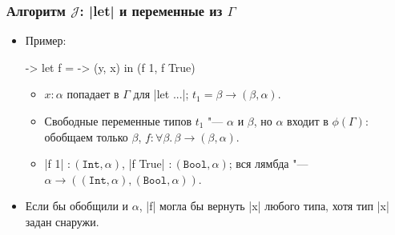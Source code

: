 \documentclass[11pt]{beamer}
\newcommand{\tInt}{\mathtt{Int}}
\newcommand{\tBool}{\mathtt{Bool}}
\newcommand{\J}{\mathcal{J}}
\begin{document}
\begin{frame}[fragile]
  \frametitle{Алгоритм $\J$: \haskinline|let| и переменные из $\Gamma$}
  \begin{itemize}
    \item Пример:
          \begin{haskell}
            \x -> let f = \y -> (y, x)
                  in (f 1, f True)
          \end{haskell}
          \pause
          \begin{itemize}
            \item $x : \alpha$ попадает в $\Gamma$ для \haskinline|let ...|; $t_1 = \beta \to (\beta, \alpha)$.
                  \pause
            \item Свободные переменные типов $t_1$ "--- \pause $\alpha$ и $\beta$, но $\alpha$ входит в $\phi(\Gamma)$: обобщаем только \pause $\beta$, $f : \forall\beta.\,\beta \to (\beta, \alpha)$.
                  \pause
            \item \haskinline|f 1| $: (\tInt, \alpha)$, \haskinline|f True| $: (\tBool, \alpha)$; вся лямбда "--- $\alpha \to ((\tInt, \alpha), (\tBool, \alpha))$.
          \end{itemize}
          \pause
    \item Если бы обобщили и $\alpha$, \haskinline|f| могла бы вернуть \haskinline|x| любого типа, хотя тип \haskinline|x| задан снаружи.
  \end{itemize}
\end{frame}
\end{document}
